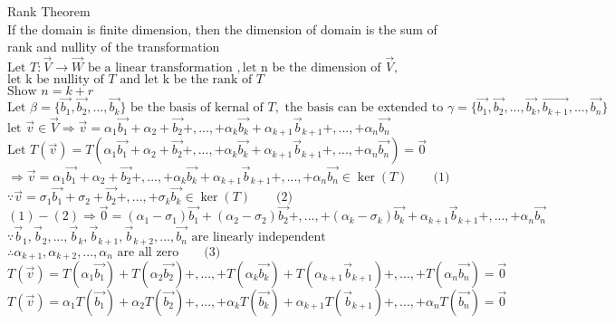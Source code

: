 \documentclass[10pt]{article}
\begin{document}
\noindent
Rank Theorem\\
If the domain is finite dimension, then the dimension of domain is the sum of rank and nullity of the transformation\\
$\text{Let } T:\vec{V} \rightarrow \vec{W} \text{ be a linear transformation },\text{let n be the dimension of }\vec{V},$\\
$\text{let k be nullity of }T \text{ and let k be the rank of }T$\\
$\text{Show } n = k + r$\\

$\text{Let }\beta = \{ \vec{b_1}, \vec{b_2},...,\vec{b_k}\} \text{ be the basis of kernal of }T, \text{ the basis can be extended to } \gamma = \{ \vec{b_1}, \vec{b_2},...,\vec{b_k}, \vec{b_{k+1}},...,\vec{b_n}\}$\\
$\text{let }\vec{v} \in \vec{V} \Rightarrow \vec{v} = \alpha_1 \vec{b_1} + \alpha_2 + \vec{b_2} +,..., + \alpha_k \vec{b_k} + \alpha_{k+1}\vec{b}_{k+1}+,...,+\alpha_{n}\vec{b_n}$\\
$\text{Let }T(\vec{v}) = T(\alpha_1 \vec{b_1} + \alpha_2 + \vec{b_2} +,..., + \alpha_k \vec{b_k} + \alpha_{k+1}\vec{b}_{k+1}+,...,+\alpha_{n}\vec{b_n}) = \vec{0}$\\
$\Rightarrow \vec{v} = \alpha_1 \vec{b_1} + \alpha_2 + \vec{b_2} +,..., + \alpha_k \vec{b_k} + \alpha_{k+1}\vec{b}_{k+1}+,...,+\alpha_{n}\vec{b_n} \in \ker(T) \quad\quad \text{(1)}$\\
$\because \vec{v} = \sigma_1 \vec{b_1} + \sigma_2 + \vec{b_2} +,..., + \sigma_k \vec{b_k} \in \ker(T) \quad\quad \text{(2)}$\\
$(1) - (2) \Rightarrow \vec{0} = (\alpha_1-\sigma_1)\vec{b_1} + (\alpha_2 - \sigma_2)\vec{b_2}+,...,+ (\alpha_k - \sigma_k)\vec{b_k}+   \alpha_{k+1}\vec{b}_{k+1}+,...,+\alpha_{n}\vec{b_n} $\\
$\because \vec{b}_{1}, \vec{b}_{2},...,\vec{b}_{k},\vec{b}_{k+1}, \vec{b}_{k+2},...,\vec{b_n} \text{ are linearly independent}$\\
$\therefore \alpha_{k+1}, \alpha_{k+2}, ... , \alpha_{n} \text{ are all zero} \quad\quad \text{(3)}$\\
$T(\vec{v}) = T(\alpha_1 \vec{b_1}) + T(\alpha_2 \vec{b_2}) +,..., + T(\alpha_k \vec{b_k}) + T(\alpha_{k+1}\vec{b}_{k+1})+,...,+T(\alpha_{n}\vec{b_n}) = \vec{0}$\\
$T(\vec{v}) = \alpha_1 T(\vec{b_1}) + \alpha_2 T(\vec{b_2}) +,..., + \alpha_k T(\vec{b_k}) + \alpha_{k+1}T(\vec{b}_{k+1})+,...,+\alpha_{n}T(\vec{b_n}) = \vec{0}$\\
\end{document}
